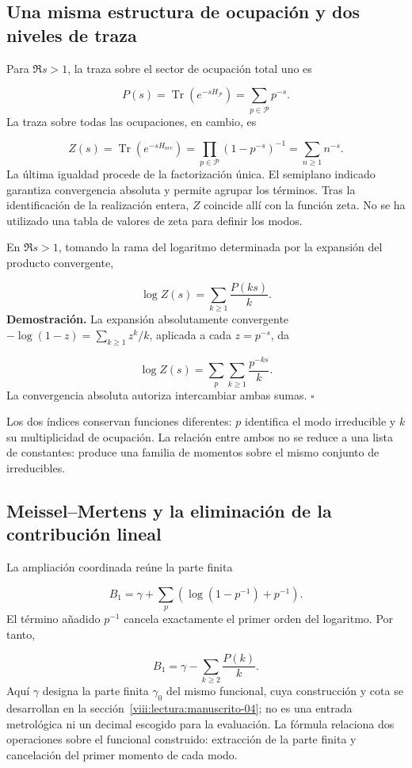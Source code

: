 \subsection{Una misma estructura de ocupación y dos niveles de traza}
Para $\Re s>1$, la traza sobre el sector de ocupación total uno es

\[
P(s)=\operatorname{Tr}(e^{-sH_{\mathcal P}})=\sum_{p\in\mathcal P}p^{-s}.
\]
La traza sobre todas las ocupaciones, en cambio, es

\[
Z(s)=\operatorname{Tr}(e^{-sH_{\mathrm{occ}}})
=\prod_{p\in\mathcal P}(1-p^{-s})^{-1}
=\sum_{n\ge1}n^{-s}.
\]
La última igualdad procede de la factorización única. El semiplano indicado garantiza convergencia absoluta y permite agrupar los términos. Tras la identificación de la realización entera, $Z$ coincide allí con la función zeta. No se ha utilizado una tabla de valores de zeta para definir los modos.

En $\Re s>1$, tomando la rama del logaritmo determinada por la expansión del producto convergente,

\[
\log Z(s)=\sum_{k\ge1}\frac{P(ks)}{k}.
\]
\textbf{Demostración.} La expansión absolutamente convergente $-\log(1-z)=\sum_{k\ge1}z^k/k$, aplicada a cada $z=p^{-s}$, da

\[
\log Z(s)=\sum_p\sum_{k\ge1}\frac{p^{-ks}}k.
\]
La convergencia absoluta autoriza intercambiar ambas sumas. \hfill\(\square\)

Los dos índices conservan funciones diferentes: $p$ identifica el modo irreducible y $k$ su multiplicidad de ocupación. La relación entre ambos no se reduce a una lista de constantes: produce una familia de momentos sobre el mismo conjunto de irreducibles.

\subsection{Meissel–Mertens y la eliminación de la contribución lineal}
La ampliación coordinada reúne la parte finita

\[
B_1=\gamma+\sum_p\left(\log(1-p^{-1})+p^{-1}\right).
\]
El término añadido $p^{-1}$ cancela exactamente el primer orden del logaritmo. Por tanto,

\[
B_1=\gamma-\sum_{k\ge2}\frac{P(k)}k.
\]
Aquí $\gamma$ designa la parte finita $\gamma_0$ del mismo funcional, cuya construcción y cota se desarrollan en la sección~\ref{viii:lectura:manuscrito-04}; no es una entrada metrológica ni un decimal escogido para la evaluación. La fórmula relaciona dos operaciones sobre el funcional construido: extracción de la parte finita y cancelación del primer momento de cada modo.


